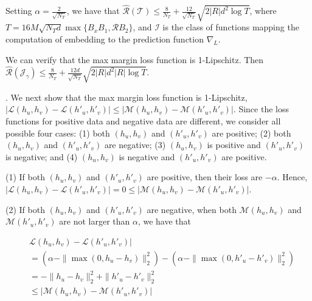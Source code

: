Setting $\alpha  = \frac{2}{\sqrt{N_T}}$, we have that 
$\hat{\mathcal{R}}(\mathcal{T})\leq\frac{8}{N_T}+
\frac{12}{\sqrt{N_T}}\sqrt{2|R|d^2\log T}$,
where $T=16M\sqrt{{N_T}d}\max\{B_xB_1,{\mathcal R}B_2\}$,
and $\mathcal{I}$ is the class of functions
mapping the computation of embedding to the prediction function $\nabla_{L}$.

We can verify that the max margin loss function 
is 1-Lipschitz.
Then ${\hat{\mathcal{R}}(\mathcal{J}_\gamma)}
\leq\frac{8}{N_T}+\frac{12d}{\sqrt{N_T}}
\sqrt{2|R|d^2|R|\log T}$.

.
We next show that the max margin loss function 
is 1-Lipschitz, 
\ie $|{\mathcal L}(h_u,h_v)-{\mathcal L}(h'_u,h'_v)|\leq 
|{\mathcal M}(h_u,h_v)-{\mathcal M}(h'_u,h'_v)|$.
Since the loss functions for positive data and negative data
are different,
we consider all possible four cases:
(1) both $(h_u,h_v)$ and $(h'_u,h'_v)$ are positive;
(2) both $(h_u,h_v)$ and $(h'_u,h'_v)$ are negative;
(3) $(h_u,h_v)$ is positive and $(h'_u,h'_v)$ is negative; and
(4) $(h_u,h_v)$ is negative and $(h'_u,h'_v)$ are positive.



\stab
(1) If both $(h_u,h_v)$ and $(h'_u,h'_v)$ are positive, 
then their loss are $-\alpha$.
Hence, 
$|{\mathcal L}(h_u,h_v)-{\mathcal L}(h'_u,h'_v)| = 0\leq 
|{\mathcal M}(h_u,h_v)-{\mathcal M}(h'_u,h'_v)|$.


\stab
(2) If both $(h_u,h_v)$ and $(h'_u,h'_v)$ are negative,
when both ${\mathcal M}(h_u,h_v)$
and ${\mathcal M}(h'_u,h'_v)$ are not larger than 
$\alpha$, we have that 

\begin{align*}
&{\mathcal L}(h_u,h_v)-{\mathcal L}(h'_u,h'_v)|\\
&=(\alpha -\|\max(0,h_u-h_v)\|^2_2) - (\alpha - \|\max(0,h'_u-h'_v)\|^2_2)\\
&=-\|h_u-h_v\|^2_2 + \|h'_u-h'_v\|^2_2 \\
&\leq |{\mathcal M}(h_u,h_v)-{\mathcal M}(h'_u,h'_v)| \tag{16}
\end{align*}

